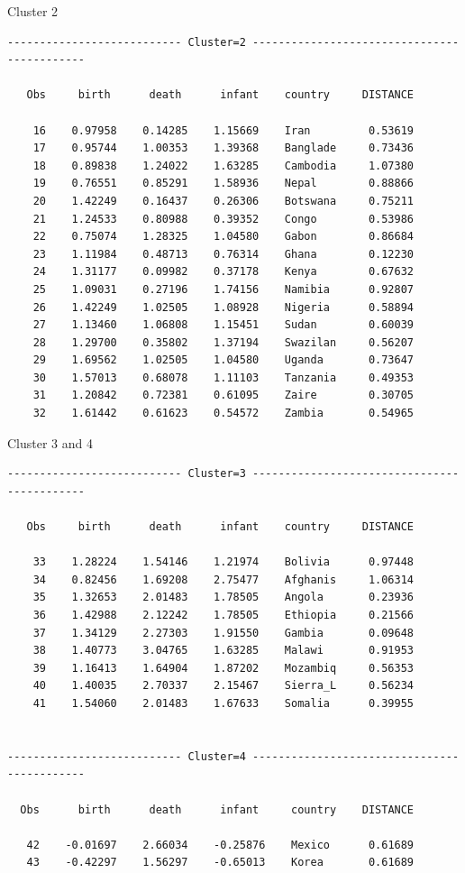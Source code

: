 \documentclass[pdf]{prosper}
\begin{document}
\begin{slide}{Cluster 2}

{\scriptsize
\begin{verbatim}
--------------------------- Cluster=2 --------------------------------------------

   Obs     birth      death      infant    country     DISTANCE

    16    0.97958    0.14285    1.15669    Iran         0.53619
    17    0.95744    1.00353    1.39368    Banglade     0.73436
    18    0.89838    1.24022    1.63285    Cambodia     1.07380
    19    0.76551    0.85291    1.58936    Nepal        0.88866
    20    1.42249    0.16437    0.26306    Botswana     0.75211
    21    1.24533    0.80988    0.39352    Congo        0.53986
    22    0.75074    1.28325    1.04580    Gabon        0.86684
    23    1.11984    0.48713    0.76314    Ghana        0.12230
    24    1.31177    0.09982    0.37178    Kenya        0.67632
    25    1.09031    0.27196    1.74156    Namibia      0.92807
    26    1.42249    1.02505    1.08928    Nigeria      0.58894
    27    1.13460    1.06808    1.15451    Sudan        0.60039
    28    1.29700    0.35802    1.37194    Swazilan     0.56207
    29    1.69562    1.02505    1.04580    Uganda       0.73647
    30    1.57013    0.68078    1.11103    Tanzania     0.49353
    31    1.20842    0.72381    0.61095    Zaire        0.30705
    32    1.61442    0.61623    0.54572    Zambia       0.54965

\end{verbatim}
}

  
\end{slide}

\begin{slide}{Cluster 3 and 4}

{\scriptsize
\begin{verbatim}
--------------------------- Cluster=3 --------------------------------------------

   Obs     birth      death      infant    country     DISTANCE

    33    1.28224    1.54146    1.21974    Bolivia      0.97448
    34    0.82456    1.69208    2.75477    Afghanis     1.06314
    35    1.32653    2.01483    1.78505    Angola       0.23936
    36    1.42988    2.12242    1.78505    Ethiopia     0.21566
    37    1.34129    2.27303    1.91550    Gambia       0.09648
    38    1.40773    3.04765    1.63285    Malawi       0.91953
    39    1.16413    1.64904    1.87202    Mozambiq     0.56353
    40    1.40035    2.70337    2.15467    Sierra_L     0.56234
    41    1.54060    2.01483    1.67633    Somalia      0.39955


--------------------------- Cluster=4 --------------------------------------------

  Obs      birth      death      infant     country    DISTANCE

   42    -0.01697    2.66034    -0.25876    Mexico      0.61689
   43    -0.42297    1.56297    -0.65013    Korea       0.61689


\end{verbatim}
}
  
\end{slide}
\end{document}
